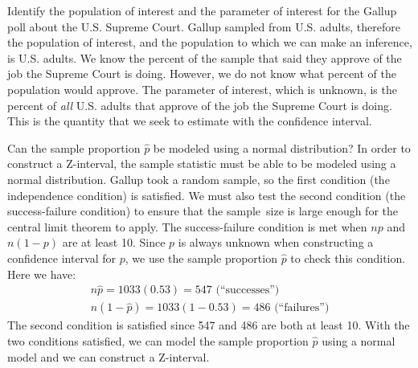 \begin{examplewrap}
\begin{nexample}{Identify the population of interest and the parameter of interest for the Gallup poll about the U.S. Supreme Court. }
Gallup sampled from U.S. adults, therefore the population of interest, and the population to which we can make an inference, is U.S. adults.  We know the percent of the sample that said they approve of the job the Supreme Court is doing.  However, we do not know what percent of the population would approve.  The parameter of interest, which is unknown, is the percent of \emph{all} U.S. adults that approve of the job the Supreme Court is doing.  This is the quantity that we seek to estimate with the confidence interval.
\end{nexample}
\end{examplewrap}


\begin{examplewrap}
\begin{nexample}{Can the sample proportion $\hat{p}$ be modeled using a normal distribution?}
In order to construct a Z-interval, the sample statistic must be able to be modeled using a normal distribution.  Gallup took a random sample, so the first condition (the independence condition) is satisfied.  We must also test the second condition (the success-failure condition) to ensure that the sample~size is large enough for the central limit theorem to apply.  The success-failure condition is met when $np$ and $n(1-p)$ are at least 10. Since $p$ is always unknown when constructing a confidence interval for $p$, we use the sample proportion $\hat{p}$ to check this condition.  Here we have:
\begin{align*}
n\hat{p} = 1033(0.53) = 547\text{ (``successes'')} \\
 n(1-\hat{p}) = 1033(1 - 0.53) = 486\text{ (``failures'')}
\end{align*}
The second condition is satisfied since 547 and 486 are both at least 10. With the two conditions satisfied, we can model the sample proportion $\hat{p}$ using a normal model and we can construct a Z-interval.
\end{nexample}
\end{examplewrap}

\D{\newpage}

